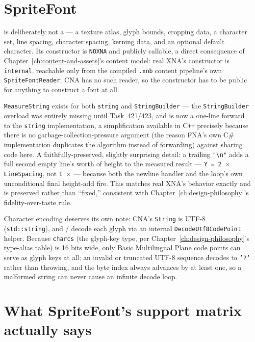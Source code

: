 \section{SpriteFont}

 is deliberately not a  --- a texture atlas,
glyph bounds, cropping data, a character set, line spacing, character spacing, kerning data,
and an optional default character. Its constructor is \texttt{NOXNA} and publicly callable,
a direct consequence of Chapter~\ref{ch:content-and-assets}'s content model: real XNA's
 constructor is \texttt{internal}, reachable only from the compiled
\texttt{.xnb} content pipeline's own \texttt{SpriteFontReader}; CNA has no such reader, so the
constructor has to be public for anything to construct a font at all.

\texttt{MeasureString} exists for both \texttt{string} and \texttt{StringBuilder} --- the
\texttt{StringBuilder} overload was entirely missing until Task~421/423, and is now a
one-line forward to the \texttt{string} implementation, a simplification available in
C\texttt{++} precisely because there is no garbage-collection-pressure argument (the reason
FNA's own C\# implementation duplicates the algorithm instead of forwarding) against sharing
code here. A faithfully-preserved, slightly surprising detail: a trailing \texttt{"\textbackslash n"}
adds a full second empty line's worth of height to the measured result ---
\texttt{Y = 2 \(\times\) LineSpacing}, not \texttt{1 \(\times\)} --- because both the newline
handler and the loop's own unconditional final height-add fire. This matches real XNA's
behavior exactly and is preserved rather than ``fixed,'' consistent with
Chapter~\ref{ch:design-philosophy}'s fidelity-over-taste rule.

Character encoding deserves its own note: CNA's \texttt{String} is UTF-8
(\texttt{std::string}), and / decode each glyph via
an internal \texttt{DecodeUtf8CodePoint} helper. Because \texttt{charcs} (the glyph-key type,
per Chapter~\ref{ch:design-philosophy}'s type-alias table) is 16 bits wide, only Basic
Multilingual Plane code points can serve as glyph keys at all; an invalid or truncated UTF-8
sequence decodes to \texttt{'?'} rather than throwing, and the byte index always advances by
at least one, so a malformed string can never cause an infinite decode loop.

\section{What SpriteFont's support matrix actually says}

